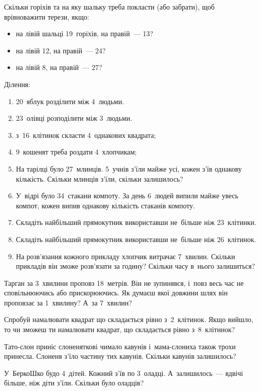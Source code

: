 \problem
Скільки горіхів та на яку шальку треба покласти (або забрати),
щоб врівноважити терези, якщо:
\begin{itemize}
    \item на лівій шальці 19~горіхів, на правій~--- 13?
    \item на лівій 12, на правій~--- 24?
    \item на лівій 8, на правій~--- 27?
\end{itemize}


\problem
Ділення:
\begin{enumerate}
    \item 20~яблук розділити між 4~людьми.
    \item 23~олівці розподілити між 3~людьми.
    \item з~16~клітинок скласти 4~однакових квадрата;
    \item 9~кошенят треба роздати 4~хлопчикам;
    \item На тарілці було 27~млинців. 5~учнів з'їли майже усі,
    кожен з'їв однакову кількість.
    Скільки млинців з'їли, скільки залишилось?
    \item У~відрі було 34~стакани компоту.
    За день 6~людей випили майже увесь компот,
    кожен випив однакову кількість стаканів компоту.
    \item Складіть найбільший прямокутник використавши
    не~більше ніж 23~клітинки.
    \item Складіть найбільший прямокутник використавши
    не~більше ніж 26~клітинок.
    \item На розв'язання кожного прикладу хлопчик витрачає 7~хвилин.
    Скільки прикладів він зможе розв'язати за годину?
    Скільки часу в~нього залишиться?
\end{enumerate}


\problem
Тарган за 3~хвилини проповз 18~метрів.
Він не зупинявся, і~повз весь час не сповільнюючись або прискорюючись.
Як думаєш якої довжини шлях він проповзає за 1~хвилину?
А~за 7~хвилин?


\problem
Спробуй намалювати квадрат що складається рівно з~2~клітинок.
Якщо вийшло, то чи зможеш ти намалювати квадрат,
що складається рівно з~8~клітинок?


\problem
Тато-слон приніс слоненяткові чимало кавунів
і~мама-слониха також трохи принесла.
Слоненя з’їло частину тих кавунів.
Скільки кавунів залишилось?


\problem
У~БеркоШко будо 4~дітей. Кожний з’їв по 3~оладці.
А~залишилось~--- вдвічі більше, ніж діти з’їли.
Скільки було оладців?


